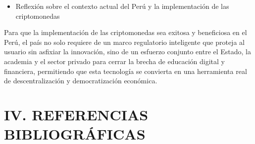\documentclass[12pt,a4paper]{article}
\begin{document}
\begin{itemize}[leftmargin=1.5em]
  \item Reflexión sobre el contexto actual del Perú y la implementación de las criptomonedas
\end{itemize}

Para que la implementación de las criptomonedas sea exitosa y beneficiosa en el Perú, el país no solo requiere de un marco regulatorio inteligente que proteja al usuario sin asfixiar la innovación, sino de un esfuerzo conjunto entre el Estado, la academia y el sector privado para cerrar la brecha de educación digital y financiera, permitiendo que esta tecnología se convierta en una herramienta real de descentralización y democratización económica.

\section{IV. REFERENCIAS BIBLIOGRÁFICAS}
\end{document}
